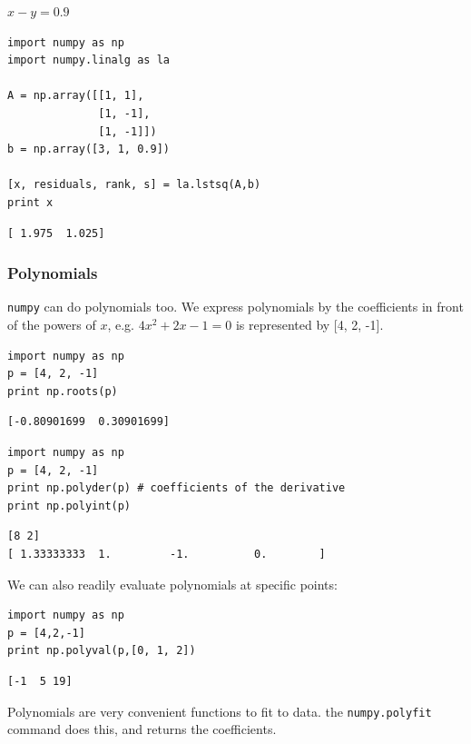 \documentclass[11pt]{article}
\begin{document}
$x - y = 0.9$

\begin{verbatim}
import numpy as np
import numpy.linalg as la

A = np.array([[1, 1],
              [1, -1],
              [1, -1]])
b = np.array([3, 1, 0.9])

[x, residuals, rank, s] = la.lstsq(A,b)
print x
\end{verbatim}

\begin{verbatim}
[ 1.975  1.025]
\end{verbatim}


\subsubsection{Polynomials}
\label{sec-3-11-3}
\texttt{numpy} can do polynomials too. We express polynomials by the coefficients in front of the powers of $x$, e.g. $4 x^2 + 2x - 1 = 0$ is represented by [4, 2, -1].

\begin{verbatim}
import numpy as np
p = [4, 2, -1]
print np.roots(p)
\end{verbatim}

\begin{verbatim}
[-0.80901699  0.30901699]
\end{verbatim}

\begin{verbatim}
import numpy as np
p = [4, 2, -1]
print np.polyder(p) # coefficients of the derivative
print np.polyint(p)
\end{verbatim}

\begin{verbatim}
[8 2]
[ 1.33333333  1.         -1.          0.        ]
\end{verbatim}

We can also readily evaluate polynomials at specific points:
\begin{verbatim}
import numpy as np
p = [4,2,-1]
print np.polyval(p,[0, 1, 2])
\end{verbatim}

\begin{verbatim}
[-1  5 19]
\end{verbatim}

Polynomials are very convenient functions to fit to data. the \texttt{numpy.polyfit} command does this, and returns the coefficients.
\end{document}
